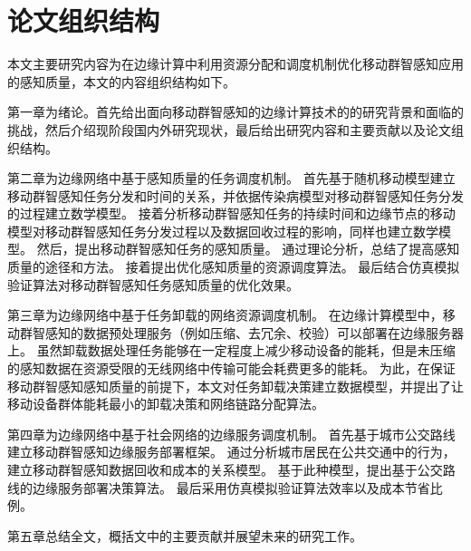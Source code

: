 \section{论文组织结构}


本文主要研究内容为在边缘计算中利用资源分配和调度机制优化移动群智感知应用的感知质量，本文的内容组织结构如下。

第一章为绪论。首先给出面向移动群智感知的边缘计算技术的的研究背景和面临的挑战，然后介绍现阶段国内外研究现状，最后给出研究内容和主要贡献以及论文组织结构。


第二章为边缘网络中基于感知质量的任务调度机制。
首先基于随机移动模型建立移动群智感知任务分发和时间的关系，并依据传染病模型对移动群智感知任务分发的过程建立数学模型。
接着分析移动群智感知任务的持续时间和边缘节点的移动模型对移动群智感知任务分发过程以及数据回收过程的影响，同样也建立数学模型。
然后，提出移动群智感知任务的感知质量。
通过理论分析，总结了提高感知质量的途径和方法。
接着提出优化感知质量的资源调度算法。
最后结合仿真模拟验证算法对移动群智感知任务感知质量的优化效果。

第三章为边缘网络中基于任务卸载的网络资源调度机制。
在边缘计算模型中，移动群智感知的数据预处理服务（例如压缩、去冗余、校验）可以部署在边缘服务器上。
虽然卸载数据处理任务能够在一定程度上减少移动设备的能耗，但是未压缩的感知数据在资源受限的无线网络中传输可能会耗费更多的能耗。
为此，在保证移动群智感知感知质量的前提下，本文对任务卸载决策建立数据模型，并提出了让移动设备群体能耗最小的卸载决策和网络链路分配算法。

第四章为边缘网络中基于社会网络的边缘服务调度机制。
首先基于城市公交路线建立移动群智感知边缘服务部署框架。
通过分析城市居民在公共交通中的行为，建立移动群智感知数据回收和成本的关系模型。
基于此种模型，提出基于公交路线的边缘服务部署决策算法。
最后采用仿真模拟验证算法效率以及成本节省比例。

第五章总结全文，概括文中的主要贡献并展望未来的研究工作。
